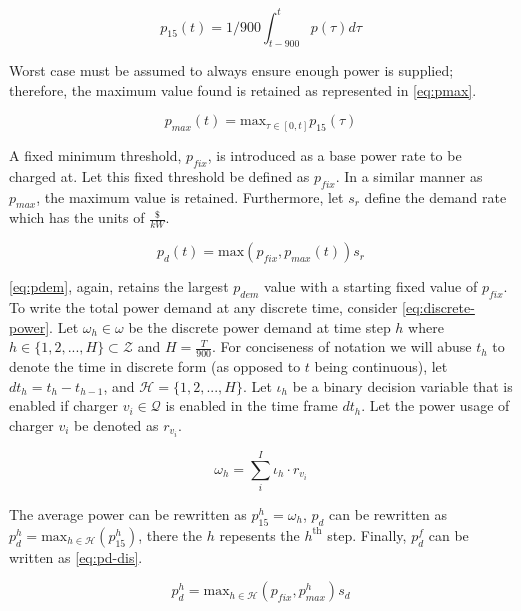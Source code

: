 \documentclass[11pt,a4paper,final]{article}
\newcommand{\Qset}{\mathcal{Q}}             %
\newcommand{\Hset}{\mathcal{H}}             %
\begin{document}
\begin{equation}
\label{eq:p15}
p_{15}(t) = 1/900 \int_{t-900}^{t} p(\tau) d\tau
\end{equation}

Worst case must be assumed to always ensure enough power is supplied; therefore, the maximum value found is retained as
represented in \ref{eq:pmax}.

\begin{equation}
\label{eq:pmax}
p_{max}(t) = \text{max}_{\tau \in [0,t]}p_{15}(\tau)
\end{equation}

A fixed minimum threshold, \(p_{fix}\), is introduced as a base power rate to be charged at. Let this fixed threshold be
defined as \(p_{fix}\). In a similar manner as \(p_{max}\), the maximum value is retained. Furthermore, let \(s_r\) define the
demand rate which has the units of \(\frac{\$}{kW}\).

\begin{equation}
\label{eq:pdem}
p_d(t) = \text{max}(p_{fix},p_{max}(t))s_r
\end{equation}

\ref{eq:pdem}, again, retains the largest \(p_{dem}\) value with a starting fixed value of \(p_{fix}\). To write the total power
demand at any discrete time, consider \ref{eq:discrete-power}. Let \(\omega_h \in \omega\) be the discrete power demand at time step \(h\)
where \(h \in \{ 1, 2, ..., H \} \subset \mathcal{Z}\) and \(H = \frac{T}{900}\). For conciseness of notation we will abuse \(t_h\) to denote
the time in discrete form (as opposed to \(t\) being continuous), let \(dt_h = t_h - t_{h-1}\), and \(\Hset = \{ 1, 2, ..., H
\}\). Let \(\iota_h\) be a binary decision variable that is enabled if charger \(v_i \in \Qset\) is enabled in the time frame
\(dt_h\). Let the power usage of charger \(v_i\) be denoted as \(r_{v_i}\).

\begin{equation}
\label{eq:discrete-power}
  \omega_h = \sum_i^I \iota_h \cdot r_{v_i}
\end{equation}

The average power can be rewritten as \(p_{15}^h = \omega_h\), \(p_d\) can be rewritten as \(p_d^h = \text{max}_{h \in \Hset}
(p_{15}^{h})\), there the \(h\) repesents the \(h^{\text{th}}\) step. Finally, \(p_d^f\) can be written as \ref{eq:pd-dis}.

\begin{equation}
\label{eq:pd-dis}
  p_d^h = \text{max}_{h \in \Hset}(p_{fix}, p_{max}^h)s_d
\end{equation}
\end{document}
